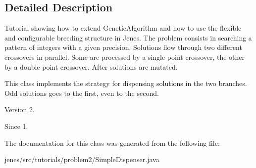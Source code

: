 \subsection{Detailed Description}
Tutorial showing how to extend {\ttfamily Genetic\-Algorithm} and how to use the flexible and configurable breeding structure in Jenes. The problem consists in searching a pattern of integers with a given precision. Solutions flow through two different crossovers in parallel. Some are processed by a single point crossover, the other by a double point crossover. After solutions are mutated.

This class implements the strategy for dispensing solutions in the two branches. Odd solutions goes to the first, even to the second.

\begin{DoxyVersion}{Version}
2. 
\end{DoxyVersion}
\begin{DoxySince}{Since}
1. 
\end{DoxySince}


The documentation for this class was generated from the following file\-:\begin{DoxyCompactItemize}
\item 
jenes/src/tutorials/problem2/Simple\-Dispenser.\-java\end{DoxyCompactItemize}
